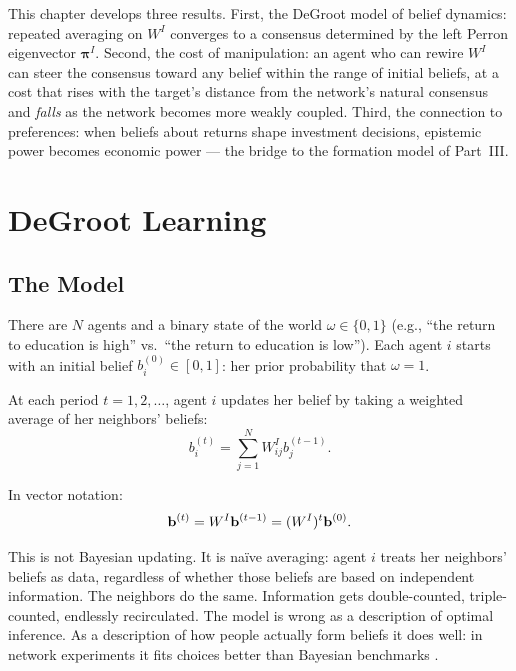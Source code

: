 \documentclass[../structural_economics_book.tex]{subfiles}
\begin{document}
This chapter develops three results. First, the DeGroot model of belief dynamics: repeated averaging on $W^I$ converges to a consensus determined by the left Perron eigenvector $\boldsymbol{\pi}^I$. Second, the cost of manipulation: an agent who can rewire $W^I$ can steer the consensus toward any belief within the range of initial beliefs, at a cost that rises with the target's distance from the network's natural consensus and \textit{falls} as the network becomes more weakly coupled. Third, the connection to preferences: when beliefs about returns shape investment decisions, epistemic power becomes economic power --- the bridge to the formation model of Part~III.


\section{DeGroot Learning}
\label{ch08:sec:degroot}

\subsection{The Model}

There are $N$ agents and a binary state of the world $\omega \in \{0, 1\}$ (e.g., ``the return to education is high'' vs.\ ``the return to education is low''). Each agent $i$ starts with an initial belief $b_i^{(0)} \in [0, 1]$: her prior probability that $\omega = 1$.

At each period $t = 1, 2, \ldots$, agent $i$ updates her belief by taking a weighted average of her neighbors' beliefs:
\begin{equation}\label{ch08:eq:degroot}
b_i^{(t)} = \sum_{j=1}^N W^I_{ij} b_j^{(t-1)}.
\end{equation}

In vector notation:
\begin{equation}\label{ch08:eq:degroot_vector}
\mathbf{b}^{(t)} = W^I \mathbf{b}^{(t-1)} = (W^I)^t \mathbf{b}^{(0)}.
\end{equation}

This is not Bayesian updating. It is na\"{i}ve averaging: agent $i$ treats her neighbors' beliefs as data, regardless of whether those beliefs are based on independent information. The neighbors do the same. Information gets double-counted, triple-counted, endlessly recirculated. The model is wrong as a description of optimal inference. As a description of how people actually form beliefs it does well: in network experiments it fits choices better than Bayesian benchmarks \citep{chandrasekhar2020testing}.
\end{document}
